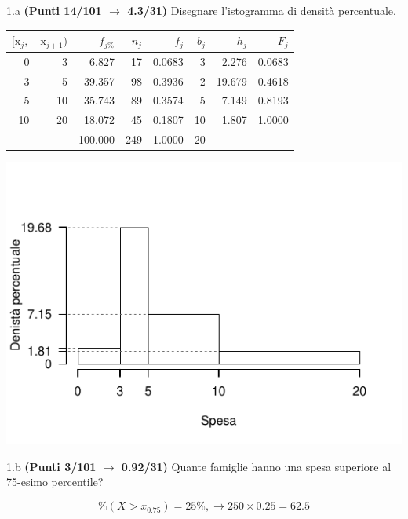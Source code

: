 \documentclass[
  11pt,
]{book}
\theoremstyle{mytheoremstyle}
\theoremstyle{mydefstyle}
\newenvironment{sol}
  {
  \begin{tcolorbox}[enhanced,breakable,arc=0.1mm,boxrule=1pt,colback=white,colframe=iblue,
  title=\bf \fontfamily{lmss}\selectfont \hspace{.5 cm} Soluzione,drop fuzzy shadow]

}{
\end{tcolorbox}
  }
\begin{document}
1.a \textbf{(Punti 14/101 \(\rightarrow\) 4.3/31)} Disegnare l'istogramma di densità percentuale.

\begin{sol}

\begin{table}[H]
\centering
\begin{tabular}{rrrrrrrr}
\toprule
$[\text{x}_j,$ & $\text{x}_{j+1})$ & $f_{j\%}$ & $n_j$ & $f_j$ & $b_j$ & $h_j$ & $F_j$\\
\midrule
0 & 3 & 6.827 & 17 & 0.0683 & 3 & 2.276 & 0.0683\\
3 & 5 & 39.357 & 98 & 0.3936 & 2 & 19.679 & 0.4618\\
5 & 10 & 35.743 & 89 & 0.3574 & 5 & 7.149 & 0.8193\\
10 & 20 & 18.072 & 45 & 0.1807 & 10 & 1.807 & 1.0000\\
 &  & 100.000 & 249 & 1.0000 & 20 &  & \\
\bottomrule
\end{tabular}
\end{table}

\begin{center}\includegraphics{Esami_passati_con_soluzioni_files/figure-latex/2022-7-1} \end{center}

\end{sol}

1.b \textbf{(Punti 3/101 \(\rightarrow\) 0.92/31)} Quante famiglie hanno una spesa superiore al 75-esimo percentile?

\begin{sol}
\[\%(X>x_{0.75})=25\% , \rightarrow 250\times 0.25=62.5 \]

\end{sol}
\end{document}
